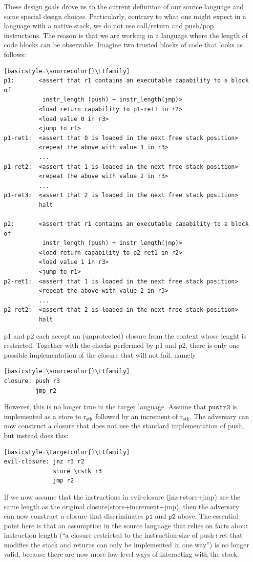 \documentclass[a4paper]{article}
\newcommand{\sourcecolor}[1]{\color{blue}}
\newcommand{\targetcolor}[1]{\color{black}}
\newcommand{\rstk}{\mathrm{r}_\mathrm{stk}}
\begin{document}
These design goals drove us to the current definition of our source language and some special design choices.
Particularly, contrary to what one might expect in a language with a native stack, we do not use call/return and push/pop instructions.
The reason is that we are working in a language where the length of code blocks can be observable.
Imagine two trusted blocks of code that looks as follows:
\begin{lstlisting}
[basicstyle=\sourcecolor{}\ttfamily] 
p1:       <assert that r1 contains an executable capability to a block of 
           instr_length (push) + instr_length(jmp)>
          <load return capability to p1-ret1 in r2>
          <load value 0 in r3>
          <jump to r1>
p1-ret1:  <assert that 0 is loaded in the next free stack position>
          <repeat the above with value 1 in r3>
          ...
p1-ret2:  <assert that 1 is loaded in the next free stack position>
          <repeat the above with value 2 in r3>
          ...
p1-ret3:  <assert that 2 is loaded in the next free stack position>
          halt

p2:       <assert that r1 contains an executable capability to a block of 
           instr_length (push) + instr_length(jmp)>
          <load return capability to p2-ret1 in r2>
          <load value 1 in r3>
          <jump to r1>
p2-ret1:  <assert that 1 is loaded in the next free stack position>
          <repeat the above with value 2 in r3>
          ...
p2-ret2:  <assert that 2 is loaded in the next free stack position>
          halt
\end{lstlisting}

p1 and p2 each accept an (unprotected) closure from the context whose lenght is restricted.
Together with the checks performed by p1 and p2, there is only one possible implementation of the closure that will not fail, namely
\begin{lstlisting}
[basicstyle=\sourcecolor{}\ttfamily] 
closure: push r3
         jmp r2
\end{lstlisting}

However, this is no longer true in the target language.
Assume that $\mathtt{push r3}$ is implemented as a store to $\rstk$ followed by an increment of $\rstk$.
The adversary can now construct a closure that does not use the standard implementation of push, but instead does this:
\begin{lstlisting}
[basicstyle=\targetcolor{}\ttfamily] 
evil-closure: jnz r3 r2
              store \rstk r3
              jmp r2
\end{lstlisting}
If we now assume that the instructions in evil-closure (jnz+store+jmp) are the same length as the original closure(store+increment+jmp), then the adversary can now construct a closure that discriminates $\mathtt{p1}$ and $\mathtt{p2}$ above.
The essential point here is that an assumption in the source language that relies on facts about instruction length (``a closure restricted to the instruction-size of push+ret that modifies the stack and returns can only be implemented in one way'') is no longer valid, because there are now more low-level ways of interacting with the stack.
\end{document}
